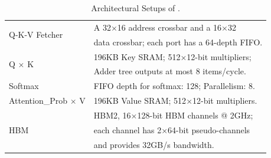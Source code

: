 \begin{table}[t]
\renewcommand*{\arraystretch}{0.5}
\setlength{\tabcolsep}{8pt}
\footnotesize
\centering
\caption{Architectural Setups of \spattenfull.}
\vspace{-5pt}
\begin{tabular}{l|l}
\toprule
  \multirow{2}{*}{Q-K-V Fetcher} & A 32$\times$16 address crossbar and a 16$\times$32 \\
   & data crossbar; each port has a 64-depth FIFO. \\ \midrule
 \multirow{2}{*}{Q $\times$ K} & 196KB Key SRAM; 512$\times$12-bit multipliers; \\
 & Adder tree outputs at most 8 items/cycle. \\ \midrule
 Softmax & FIFO depth for softmax: 128; Parallelism: 8. \\ \midrule
 Attention\_Prob $\times$ V & 196KB Value SRAM; 512$\times$12-bit multipliers.  \\ \midrule
 \multirow{3}{*}{HBM} & HBM2, 16$\times$128-bit HBM channels @ 2GHz;\\
 & each channel has 2$\times$64-bit pseudo-channels \\
 & and provides 32GB/s bandwidth. \\
 \bottomrule
\end{tabular}
\vspace{-10pt}
\label{tab:setup}
\end{table}

